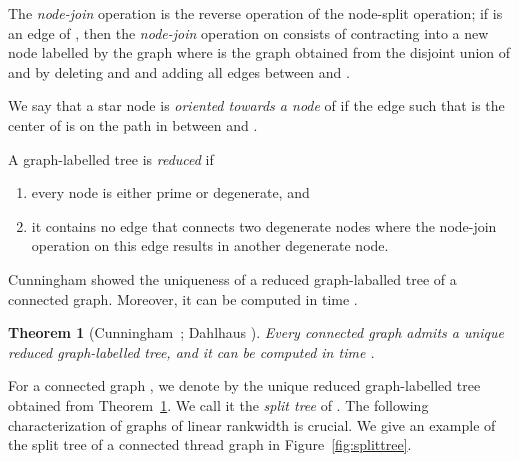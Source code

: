 \documentclass[11pt]{article}
\newtheorem{theorem}{Theorem}[section]
\theoremstyle{remark}
\begin{document}
The \emph{node-join} operation is the reverse operation of the node-split operation; 
if  is an edge of , then the \emph{node-join} operation on  
consists of contracting  into a new node  labelled by the graph  
where  is the graph obtained from the disjoint union of  and  
by deleting  and  and adding all edges between  and .

We say that a star node  is \emph{oriented towards a node } of  if the edge  such that  is the center
of  is on the path in  between  and . 


A graph-labelled tree is \emph{reduced} if  
\begin{enumerate}[(1)]
\item every node is either prime or degenerate, and 
\item it contains no edge that connects two degenerate nodes where the node-join operation on this edge results in another degenerate node.
 \end{enumerate}
Cunningham showed the uniqueness of a reduced graph-laballed tree of a connected graph.
Moreover, it can be computed in time .



\begin{theorem}[Cunningham~\cite{Cunningham1982}; Dahlhaus \cite{Dahlhaus00}]\label{thm:cunningham}
Every connected graph  admits a unique reduced graph-labelled tree, and it can be computed in time .
\end{theorem} 
 
For a connected graph , we denote by  the unique reduced graph-labelled tree obtained from Theorem~\ref{thm:cunningham}.
We call it the \emph{split tree} of .
The following characterization of graphs of linear rankwidth  is crucial.
We give an example of the split tree of a connected thread graph in Figure~\ref{fig:splittree}.
\end{document}
